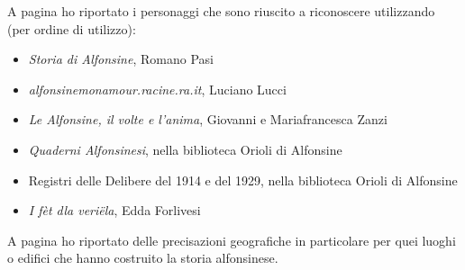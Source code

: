 \documentclass[10pt]{memoir} %
\begin{document}
A pagina \pageref{Personaggi} ho riportato i personaggi che sono riuscito a riconoscere utilizzando (per ordine di utilizzo):
\begin{itemize}
\item{\emph{Storia di Alfonsine}, Romano Pasi}
\item{\emph{alfonsinemonamour.racine.ra.it}, Luciano Lucci}
\item{\emph{Le Alfonsine, il volte e l'anima}, Giovanni e Mariafrancesca Zanzi}
\item{\emph{Quaderni Alfonsinesi}, nella biblioteca Orioli di Alfonsine}
\item{Registri delle Delibere del 1914 e del 1929, nella biblioteca Orioli di Alfonsine}
\item{\emph{I fèt dla veriëla}, Edda Forlivesi}
\end{itemize}

A pagina \pageref{Luoghi} ho riportato delle precisazioni geografiche in particolare per quei luoghi o edifici che hanno costruito la storia alfonsinese.

\mainmatter

\end{document}
